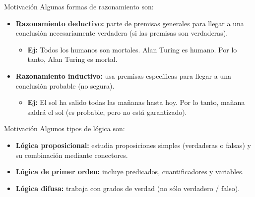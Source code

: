 \documentclass{beamer}
\begin{document}
\begin{frame}{Motivación}
  Algunas formas de razonamiento son:
  \begin{itemize}[<+->]
    \item \textbf{Razonamiento deductivo:} parte de premisas generales para
          llegar a una conclusión necesariamente verdadera (si las premisas son
          verdaderas).

          \begin{itemize}
            \item \textbf{Ej:} Todos los humanos son mortales. Alan Turing es
                  humano. Por lo tanto, Alan Turing es mortal.
          \end{itemize}
    \item \textbf{Razonamiento inductivo:} usa premisas específicas para llegar
          a una conclusión probable (no segura).
          \begin{itemize}
            \item \textbf{Ej:} El sol ha salido todas las mañanas hasta hoy. Por
                  lo tanto, mañana saldrá el sol (es probable, pero no está
                  garantizado).
          \end{itemize}
  \end{itemize}
\end{frame}


\begin{frame}{Motivación}
  Algunos tipos de lógica son:
  \begin{itemize}[<+->]
    \item \textbf{Lógica proposicional:} estudia proposiciones simples
          (verdaderas o falsas) y su combinación mediante conectores.
    \item \textbf{Lógica de primer orden:} incluye predicados, cuantificadores y
          variables.
    \item \textbf{Lógica difusa:} trabaja con grados de verdad (no sólo
          verdadero / falso).
  \end{itemize}
\end{frame}
\end{document}
